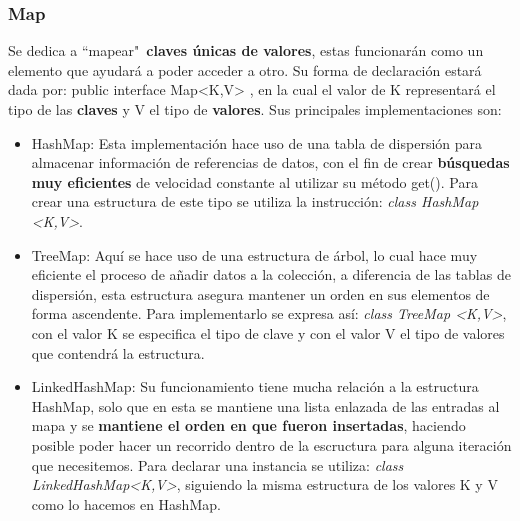 \documentclass[12pt]{report}
\begin{document}
\subsubsection{Map}
Se dedica a ``mapear"\ \textbf{claves únicas de valores}, estas funcionarán como un elemento que ayudará a poder acceder a otro. Su forma de declaración estará dada por: public interface Map<K,V> , en la cual el valor de K representará el tipo de las \textbf{claves} y V el tipo de \textbf{valores}. \cite{Departament}
Sus principales implementaciones son:
\begin{itemize}
    \item HashMap: Esta implementación hace uso de una tabla de dispersión para almacenar información de referencias de datos, con el fin de crear \textbf{búsquedas muy eficientes} de velocidad constante al utilizar su método get(). Para crear una estructura de este tipo se utiliza la instrucción: \textit{class HashMap <K,V>}.
    
    \item TreeMap: Aquí se hace uso de una estructura de árbol, lo cual hace muy eficiente el proceso de añadir datos a la colección, a diferencia de las tablas de dispersión, esta estructura asegura mantener un orden en sus elementos de forma ascendente. Para implementarlo se expresa así: \textit{class TreeMap <K,V>}, con el valor K se especifica el tipo de clave y con el valor V el tipo de valores que contendrá la estructura.
    
    \item LinkedHashMap: Su funcionamiento tiene mucha relación a la estructura HashMap, solo que en esta se mantiene una lista enlazada de las entradas al mapa y se \textbf{mantiene el orden en que fueron insertadas}, haciendo posible poder hacer un recorrido dentro de la escructura para alguna iteración que necesitemos. Para declarar una instancia se utiliza: \textit{class LinkedHashMap<K,V>}, siguiendo la misma estructura de los valores K y V como lo hacemos en HashMap. 
\end{itemize}

\end{document}
